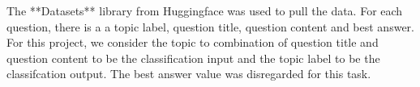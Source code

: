 \documentclass{article}
\begin{document}
The **Datasets** library from Huggingface was used to pull the data. For each question, there is a a topic label, question title, question content and best answer. For 
this project, we consider the topic to combination of question title and question content to be the classification input and the topic label to be the classifcation output. 
The best answer value was disregarded for this task.



\end{document}
